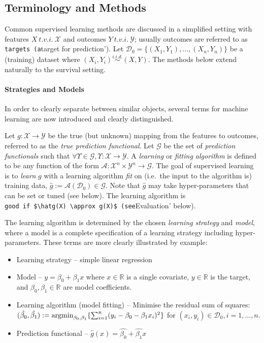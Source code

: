 \documentclass[
  letterpaper,
]{scrbook}
\let\oldparagraph\paragraph
\renewcommand{\paragraph}[1]{\oldparagraph{#1}\mbox{}}
\providecommand{\tightlist}{%
  \setlength{\itemsep}{0pt}\setlength{\parskip}{0pt}}\usepackage{longtable,booktabs,array}
\theoremstyle{plain}
\theoremstyle{definition}
\theoremstyle{remark}
\begin{document}
\subsection{Terminology and Methods}
\label{sec:surv_setml_meth}

Common supervised learning methods are discussed in a simplified setting
with features \(X \ t.v.i. \ \mathcal{X}\) and outcomes
\(Y \ t.v.i. \ \mathcal{Y}\); usually outcomes are referred to as
\texttt{targets\textquotesingle{}\ (a}target for prediction'). Let
\(\mathcal{D}_0 = \{(X_1,Y_1),...,(X_n,Y_n)\}\) be a (training) dataset
where \((X_i, Y_i) \stackrel{i.i.d.}\sim(X, Y)\). The methods below
extend naturally to the survival setting.

\paragraph{Strategies and Models}

In order to clearly separate between similar objects, several terms for
machine learning are now introduced and clearly distinguished.

Let \(g: \mathcal{X}\rightarrow \mathcal{Y}\) be the true (but unknown)
mapping from the features to outcomes, referred to as the
\emph{true prediction functional}. Let \(\mathcal{G}\) be the set of
\emph{prediction functionals} such that
\(\forall \Upsilon \in \mathcal{G}, \Upsilon: \mathcal{X}\rightarrow \mathcal{Y}\).
A \emph{learning} or \emph{fitting algorithm} is defined to be any
function of the form
\(\mathcal{A}: \mathcal{X}^n \times \mathcal{Y}^n \rightarrow \mathcal{G}\).
The goal of supervised learning is to \emph{learn} \(g\) with a learning
algorithm \emph{fit} on (i.e.~the input to the algorithm is) training
data, \(\hat{g}:= \mathcal{A}(\mathcal{D}_0) \in \mathcal{G}\). Note
that \(\hat{g}\) may take hyper-parameters that can be set or tuned (see
below). The learning algorithm is
\texttt{good\textquotesingle{}\ if\ \$\textbackslash{}hatg(X)\ \textbackslash{}approx\ g(X)\$\ (see}Evaluation'
below).

The learning algorithm is determined by the chosen
\emph{learning strategy} and \emph{model}, where a model is a complete
specification of a learning strategy including hyper-parameters. These
terms are more clearly illustrated by example:

\begin{itemize}
\tightlist
\item
  Learning strategy -- simple linear regression
\item
  Model -- \(y = \beta_0 + \beta_1 x\) where \(x \in \mathbb{R}\) is a
  single covariate, \(y \in \mathbb{R}\) is the target, and
  \(\beta_0,\beta_1 \in \mathbb{R}\) are model coefficients.
\item
  Learning algorithm (model fitting) -- Minimise the residual sum of
  squares:
  \((\hat{\beta_0}, \hat{\beta_1}) := \operatornamewithlimits{argmin}_{\beta_0,\beta_1} \{\sum^n_{i=1} (y_i - \beta_0 - \beta_1 x_i)^2\}\)
  for \((x_i,y_i) \in \mathcal{D}_0, i = 1,...,n\).
\item
  Prediction functional --
  \(\hat{g}(x) = \hat{\beta_0} + \hat{\beta_1}x\)
\end{itemize}
\end{document}
